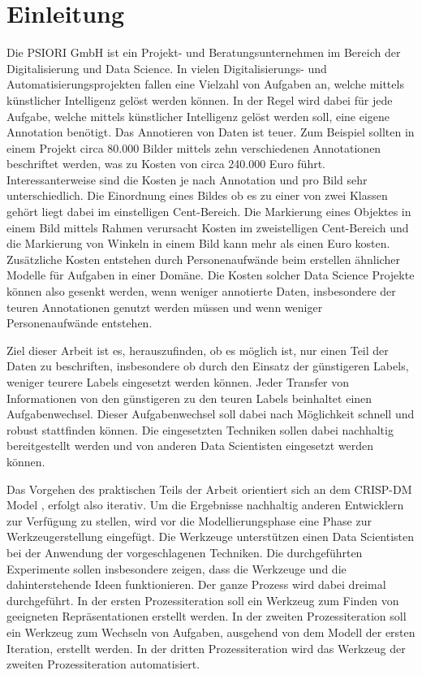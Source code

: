 \listoftodos

\chapter{Einleitung}
\label{chap:Einleitung}
	Die PSIORI GmbH \cite{PSIORIGmbH.2020} ist ein Projekt- und Beratungsunternehmen im Bereich der Digitalisierung und Data Science. In vielen Digitalisierungs- und Automatisierungsprojekten fallen eine Vielzahl von Aufgaben an, welche mittels künstlicher Intelligenz gelöst werden können. In der Regel wird dabei für jede Aufgabe, welche mittels künstlicher Intelligenz gelöst werden soll, eine eigene Annotation benötigt. Das Annotieren von Daten ist teuer. Zum Beispiel sollten in einem Projekt circa 80.000 Bilder mittels zehn verschiedenen Annotationen beschriftet werden, was zu Kosten von circa 240.000 Euro führt. Interessanterweise sind die Kosten je nach Annotation und pro Bild sehr unterschiedlich. Die Einordnung eines Bildes ob es zu einer von zwei Klassen gehört liegt dabei im einstelligen Cent-Bereich. Die Markierung eines Objektes in einem Bild mittels Rahmen verursacht Kosten im zweistelligen Cent-Bereich und die Markierung von Winkeln in einem Bild kann mehr als einen Euro kosten. Zusätzliche Kosten entstehen durch Personenaufwände beim erstellen ähnlicher Modelle für Aufgaben in einer Domäne. Die Kosten solcher Data Science Projekte können also gesenkt werden, wenn weniger annotierte Daten, insbesondere der teuren Annotationen genutzt werden müssen und wenn weniger Personenaufwände entstehen.
	
	Ziel dieser Arbeit ist es, herauszufinden, ob es möglich ist, nur einen Teil der Daten zu beschriften, insbesondere ob durch den Einsatz der günstigeren Labels, weniger teurere Labels eingesetzt werden können. Jeder Transfer von Informationen von den günstigeren zu den teuren Labels beinhaltet einen Aufgabenwechsel. Dieser Aufgabenwechsel soll dabei nach Möglichkeit schnell und robust stattfinden können. Die eingesetzten Techniken sollen dabei nachhaltig bereitgestellt werden und von anderen Data Scientisten eingesetzt werden können. 
	
	Das Vorgehen des praktischen Teils der Arbeit orientiert sich an dem CRISP-DM Model \cite{Shearer.2000}, erfolgt also iterativ. Um die Ergebnisse nachhaltig anderen Entwicklern zur Verfügung zu stellen, wird vor die Modellierungsphase eine Phase zur Werkzeugerstellung eingefügt. Die Werkzeuge unterstützen einen Data Scientisten bei der Anwendung der vorgeschlagenen Techniken. Die durchgeführten Experimente sollen insbesondere zeigen, dass die Werkzeuge und die dahinterstehende Ideen funktionieren. Der ganze Prozess wird dabei dreimal durchgeführt. In der ersten Prozessiteration soll ein Werkzeug zum Finden von geeigneten Repräsentationen erstellt werden. In der zweiten Prozessiteration soll ein Werkzeug zum Wechseln von Aufgaben, ausgehend von dem Modell der ersten Iteration, erstellt werden. In der dritten Prozessiteration wird das Werkzeug der zweiten Prozessiteration automatisiert.
	
